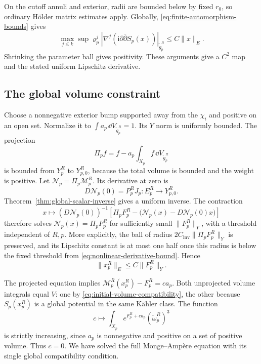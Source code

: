 On the cutoff annuli and exterior, radii are
bounded below by fixed $r_0$, so ordinary
Hölder matrix estimates apply. Globally,
\eqref{eq:finite-automorphism-bounds} gives
\begin{equation}\label{eq:nonlinear-tensor-bound}
 \max_{j\le k}\sup\varrho_p^j
 |\nabla^j(\mathrm i\partial\bar\partial S_p(x))|
                    _{\widetilde g_p^R}\le C\|x\|_E.
\end{equation}
Shrinking the parameter ball gives positivity.
These arguments give a $C^2$ map and the
stated uniform Lipschitz derivative.

\subsection{The global volume constraint}

Choose a nonnegative exterior bump supported
away from the $\chi_i$ and positive on an
open set. Normalize it to
$\int a_p\,\dd V_{\widetilde g_p^R}=1$.
Its $Y$ norm is uniformly bounded. The
projection
\[
 \Pi_p f=f-a_p\int_{X_p}f\,\dd V_{\widetilde g_p^R}
\]
is bounded from $Y_p^R$ to $Y_{p,0}^R$,
because the total volume is bounded and
the weight is positive. Let
$\mathcal N_p=\Pi_p\mathcal M_p^R$. Its
derivative at zero is
\[
 D\mathcal N_p(0)=P_p^R J_p:
                  E_p^R\longrightarrow Y_{p,0}^R.
\]
Theorem~\ref{thm:global-scalar-inverse} gives
a uniform inverse. The contraction
\begin{equation}\label{eq:nonlinear-contraction}
 x\longmapsto (D\mathcal N_p(0))^{-1}
 \left[\Pi_pF_p^R-
       \bigl(\mathcal N_p(x)-D\mathcal N_p(0)x\bigr)\right]
\end{equation}
therefore solves
$\mathcal N_p(x)=\Pi_pF_p^R$ for sufficiently
small $\|F_p^R\|_Y$, with a threshold independent
of $R,p$. More explicitly, the ball of radius
$2C_{\mathrm{inv}}\|\Pi_pF_p^R\|_Y$ is
preserved, and its Lipschitz constant is at
most one half once this radius is below the
fixed threshold from
\eqref{eq:nonlinear-derivative-bound}. Hence
\begin{equation}\label{eq:nonlinear-solution-bound}
 \|x_p^R\|_E\le C\|F_p^R\|_Y.
\end{equation}

The projected equation implies
$\mathcal M_p^R(x_p^R)-F_p^R=c a_p$.
Both unprojected volume integrals equal $V$:
one by \eqref{eq:initial-volume-compatibility},
the other because $S_p(x_p^R)$ is a global
potential in the same Kähler class.
The function
\[
 c\longmapsto
 \int_{X_p}e^{F_p^R+c a_p}(\widetilde\omega_p^R)^3
\]
is strictly increasing, since $a_p$ is
nonnegative and positive on a set of positive
volume. Thus $c=0$. We have solved the full
Monge--Ampère equation with its single global
compatibility condition.

